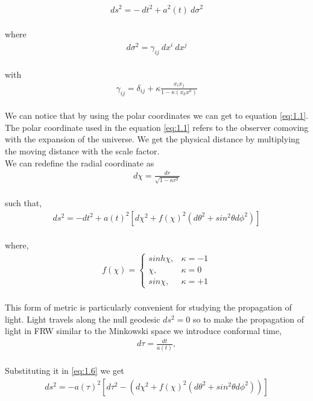 \begin{align}
    d{s^2} = -\ d{t^2} + a^2(t) \ d{\sigma^2}\label{eq:1.2}
\end{align}\\
where 
\begin{align}
     d{\sigma^2} = \gamma_{ij} \ d{x^{i}} \ d{x^{j}}\label{eq:1.3}
\end{align}\\
with 
\begin{align}
    \gamma_{ij}= \delta_{ij} + \kappa\frac{x_{i}x_{j}}{1-\kappa(x_k x^k)}\label{eq:1.4}
\end{align}\\
\hspace{0.5cm}We can notice that by using the polar coordinates we can  get to equation \ref{eq:1.1}. The polar coordinate used in the equation \ref{eq:1.1} refers to the observer comoving with the expansion of the universe. We get the physical distance by multiplying the moving distance with the scale factor.\\
We can redefine the radial coordinate as  
\begin{align}
    d\chi = \frac{dr}{\sqrt{1-\kappa r^2}}\label{eq:1.5}
\end{align}\\
such that,
\begin{align}
   ds^2= -dt^2 + a(t)^2\left[{d\chi^2}+ f(\chi)^2(d\theta^2 +sin^2\theta d\phi^2)\right ]\label{eq:1.6}
\end{align}\\
where,
\begin{align}
    f(\chi) = \begin{cases}
        sinh\chi,& \kappa=-1\\
        \chi,& \kappa=0\\
        sin\chi,& \kappa=+1
    \end{cases}
\end{align}\\
This form of metric is particularly convenient for studying the propagation of light. Light travels along the null geodesic $ds^2=0$ so to make the propagation of light in FRW similar to the Minkowski space we introduce conformal time,
\begin{align}
    d\tau = \frac{dt}{a(t)},\label{eq:1.8}
\end{align}\\
Substituting it in \ref{eq:1.6} we get 
\begin{align}
    ds^2= -a(\tau)^2\left[d\tau^2 - \left({d\chi^2}+ f(\chi)^2(d\theta^2 +sin^2\theta d\phi^2)\right)\right ]\label{eq:1.9}
\end{align}

